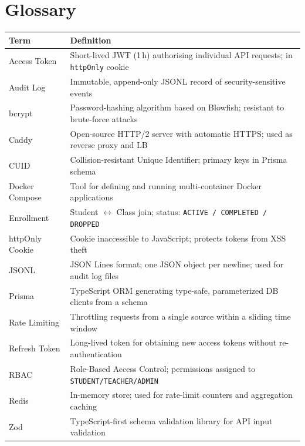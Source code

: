 \documentclass[12pt,a4paper]{article}
\begin{document}
\appendix
\section{Glossary}

\begin{tabularx}{\textwidth}{L{3.5cm} L{10cm}}
  \toprule
  \textbf{Term} & \textbf{Definition} \\
  \midrule
  Access Token   & Short-lived JWT (1\,h) authorising individual API requests; in \texttt{httpOnly} cookie \\
  Audit Log      & Immutable, append-only JSONL record of security-sensitive events \\
  bcrypt         & Password-hashing algorithm based on Blowfish; resistant to brute-force attacks \\
  Caddy          & Open-source HTTP/2 server with automatic HTTPS; used as reverse proxy and LB \\
  CUID           & Collision-resistant Unique Identifier; primary keys in Prisma schema \\
  Docker Compose & Tool for defining and running multi-container Docker applications \\
  Enrollment     & Student $\leftrightarrow$ Class join; status: \texttt{ACTIVE / COMPLETED / DROPPED} \\
  httpOnly Cookie & Cookie inaccessible to JavaScript; protects tokens from XSS theft \\
  JSONL          & JSON Lines format; one JSON object per newline; used for audit log files \\
  Prisma         & TypeScript ORM generating type-safe, parameterized DB clients from a schema \\
  Rate Limiting  & Throttling requests from a single source within a sliding time window \\
  Refresh Token  & Long-lived token for obtaining new access tokens without re-authentication \\
  RBAC           & Role-Based Access Control; permissions assigned to \texttt{STUDENT/TEACHER/ADMIN} \\
  Redis          & In-memory store; used for rate-limit counters and aggregation caching \\
  Zod            & TypeScript-first schema validation library for API input validation \\
  \bottomrule
\end{tabularx}
\end{document}
